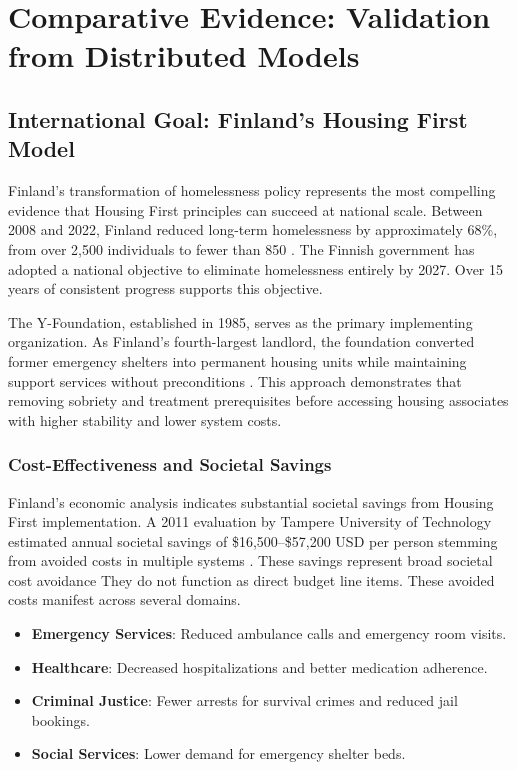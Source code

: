 \documentclass[12pt, letterpaper]{article}
\begin{document}
\newpage

\section{Comparative Evidence: Validation from Distributed Models}

\subsection{International Goal: Finland's Housing First Model}

Finland's transformation of homelessness policy represents the most compelling evidence that Housing First principles can succeed at national scale. Between 2008 and 2022, Finland reduced long-term homelessness by approximately 68\%, from over 2,500 individuals to fewer than 850 \citep{sdg16plus_2023}. The Finnish government has adopted a national objective to eliminate homelessness entirely by 2027. Over 15 years of consistent progress supports this objective.

The Y-Foundation, established in 1985, serves as the primary implementing organization. As Finland's fourth-largest landlord, the foundation converted former emergency shelters into permanent housing units while maintaining support services without preconditions \citep{the_atlas_2023}. This approach demonstrates that removing sobriety and treatment prerequisites before accessing housing associates with higher stability and lower system costs.

\subsubsection{Cost-Effectiveness and Societal Savings}

Finland's economic analysis indicates substantial societal savings from Housing First implementation. A 2011 evaluation by Tampere University of Technology estimated annual societal savings of \$16,500--\$57,200 USD per person stemming from avoided costs in multiple systems \citep{sdg16plus_2023}. These savings represent broad societal cost avoidance They do not function as direct budget line items. These avoided costs manifest across several domains.

\begin{itemize}
    \item \textbf{Emergency Services}: Reduced ambulance calls and emergency room visits.
    \item \textbf{Healthcare}: Decreased hospitalizations and better medication adherence.
    \item \textbf{Criminal Justice}: Fewer arrests for survival crimes and reduced jail bookings.
    \item \textbf{Social Services}: Lower demand for emergency shelter beds.
\end{itemize}
\end{document}
